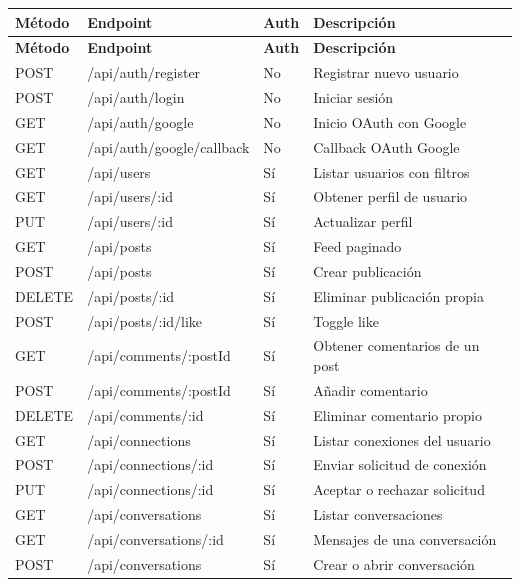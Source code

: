 \documentclass[a4paper]{report}
\begin{document}
\begin{longtable}{llll}
  \toprule
  \textbf{Método} & \textbf{Endpoint} & \textbf{Auth} & \textbf{Descripción} \\
  \midrule
  \endfirsthead
  \toprule
  \textbf{Método} & \textbf{Endpoint} & \textbf{Auth} & \textbf{Descripción} \\
  \midrule
  \endhead
  \bottomrule
  \endfoot
  POST   & /api/auth/register          & No  & Registrar nuevo usuario \\
  POST   & /api/auth/login             & No  & Iniciar sesión \\
  GET    & /api/auth/google            & No  & Inicio OAuth con Google \\
  GET    & /api/auth/google/callback   & No  & Callback OAuth Google \\
  GET    & /api/users                  & Sí  & Listar usuarios con filtros \\
  GET    & /api/users/:id              & Sí  & Obtener perfil de usuario \\
  PUT    & /api/users/:id              & Sí  & Actualizar perfil \\
  GET    & /api/posts                  & Sí  & Feed paginado \\
  POST   & /api/posts                  & Sí  & Crear publicación \\
  DELETE & /api/posts/:id              & Sí  & Eliminar publicación propia \\
  POST   & /api/posts/:id/like         & Sí  & Toggle like \\
  GET    & /api/comments/:postId       & Sí  & Obtener comentarios de un post \\
  POST   & /api/comments/:postId       & Sí  & Añadir comentario \\
  DELETE & /api/comments/:id           & Sí  & Eliminar comentario propio \\
  GET    & /api/connections            & Sí  & Listar conexiones del usuario \\
  POST   & /api/connections/:id        & Sí  & Enviar solicitud de conexión \\
  PUT    & /api/connections/:id        & Sí  & Aceptar o rechazar solicitud \\
  GET    & /api/conversations          & Sí  & Listar conversaciones \\
  GET    & /api/conversations/:id      & Sí  & Mensajes de una conversación \\
  POST   & /api/conversations          & Sí  & Crear o abrir conversación \\

\end{longtable}
\end{document}
